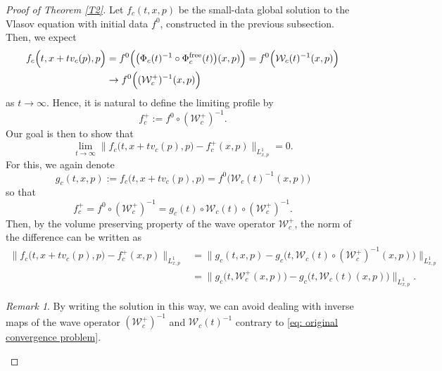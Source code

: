 \documentclass[reqno, 11pt, letterpaper]{amsart}
\theoremstyle{remark}
\newtheorem{remark}[theorem]{Remark}
\numberwithin{equation}{section}
\numberwithin{theorem}{section}
\numberwithin{table}{section}
\numberwithin{figure}{section}
\begin{document}
\begin{proof}[Proof of Theorem \ref{T2}]
Let $f_c(t,x,p)$ be the small-data global solution to the Vlasov equation with initial data $f^0$, constructed in the previous subsection. Then, we expect
\begin{equation}\label{eq: original convergence problem}
\begin{aligned}
f_c\Big(t,x+tv_c(p),p\Big)&=f^0\Big(\big(\Phi_c(t)^{-1}\circ\Phi_c^{\textup{free}}(t)\big)(x,p)\Big)=f^0\Big(\mathcal{W}_c(t)^{-1}(x,p)\Big)\\
&\to f^0\Big((\mathcal{W}_c^+)^{-1}(x,p)\Big)
\end{aligned}
\end{equation}
as $t\to\infty$.  Hence, it is natural to define the limiting profile by
$$f_c^+:= f^0\circ (\mathcal{W}_c^+)^{-1}.$$
Our goal is then to show that 
$$\lim_{t\to\infty}\Big\|f_c\Big(t,x+tv_c(p),p\Big)-f_c^+(x,p)\Big\|_{L_{x,p}^1}=0.$$
For this, we again denote
\begin{equation}\label{eq: gc definition}
g_c(t,x,p):=f_c\Big(t,x+tv_c(p),p\Big)=f^0\Big(\mathcal{W}_c(t)^{-1}(x,p)\Big)
\end{equation}
so that 
$$f_c^+= f^0\circ (\mathcal{W}_c^+)^{-1}=g_c(t)\circ \mathcal{W}_c(t)\circ (\mathcal{W}_c^+)^{-1}.$$
Then, by the volume preserving property of the wave operator $\mathcal{W}_c^+$, the norm of the difference can be written as 
$$\begin{aligned}
\Big\|f_c\Big(t,x+tv_c(p),p\Big)-f_c^+(x,p)\Big\|_{L_{x,p}^1}&=\Big\|g_c(t,x,p)-g_c\Big(t,\mathcal{W}_c(t)\circ (\mathcal{W}_c^+)^{-1}(x,p)\Big)\Big\|_{L_{x,p}^1}\\
&=\Big\|g_c\Big(t,\mathcal{W}_c^+(x,p)\Big)-g_c\Big(t,\mathcal{W}_c(t)(x,p)\Big)\Big\|_{L_{x,p}^1}.
\end{aligned}$$

\begin{remark}
By writing the solution in this way, we can avoid dealing with inverse maps of the wave operator $(\mathcal{W}_c^+)^{-1}$ and $\mathcal{W}_c(t)^{-1}$ contrary to \eqref{eq: original convergence problem}. 
\end{remark}


\end{proof}
\end{document}
